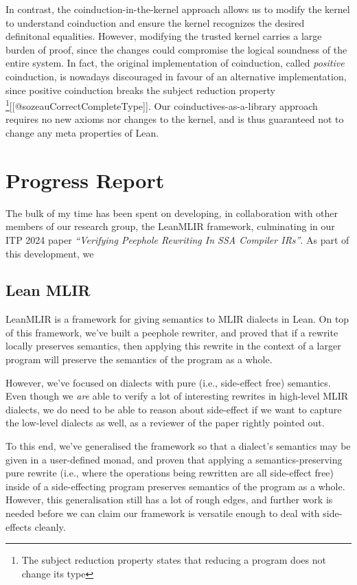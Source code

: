 \documentclass[a4paper]{article}
\begin{document}
In contrast, the coinduction-in-the-kernel approach allows us to modify
the kernel to understand coinduction and ensure the kernel recognizes
the desired definitonal equalities. However, modifying the trusted
kernel carries a large burden of proof, since the changes could
compromise the logical soundness of the entire system. In fact, the
original implementation of coinduction, called \emph{positive}
coinduction, is nowadays discouraged in favour of an alternative
implementation, since positive coinduction breaks the subject reduction
property \footnote{ The subject reduction property states that reducing
  a program does not change its type}{[}{[}@sozeauCorrectCompleteType{]}{]}.
Our coinductives-as-a-library approach requires no new axioms nor
changes to the kernel, and is thus guaranteed not to change any meta
properties of Lean.

\hypertarget{progress-report}{%
\section{Progress Report}\label{progress-report}}

The bulk of my time has been spent on developing, in collaboration with
other members of our research group, the LeanMLIR framework, culminating
in our ITP 2024 paper \emph{``Verifying Peephole Rewriting In SSA
Compiler IRs''}. As part of this development, we

\hypertarget{lean-mlir}{%
\subsection{Lean MLIR}\label{lean-mlir}}

LeanMLIR is a framework for giving semantics to MLIR dialects in Lean.
On top of this framework, we've built a peephole rewriter, and proved
that if a rewrite locally preserves semantics, then applying this
rewrite in the context of a larger program will preserve the semantics
of the program as a whole.

However, we've focused on dialects with pure (i.e., side-effect free)
semantics. Even though we \emph{are} able to verify a lot of interesting
rewrites in high-level MLIR dialects, we do need to be able to reason
about side-effect if we want to capture the low-level dialects as well,
as a reviewer of the paper rightly pointed out.

To this end, we've generalised the framework so that a dialect's
semantics may be given in a user-defined monad, and proven that applying
a semantics-preserving pure rewrite (i.e., where the operations being
rewritten are all side-effect free) inside of a side-effecting program
preserves semantics of the program as a whole. However, this
generalisation still has a lot of rough edges, and further work is
needed before we can claim our framework is versatile enough to deal
with side-effects cleanly.
\end{document}
